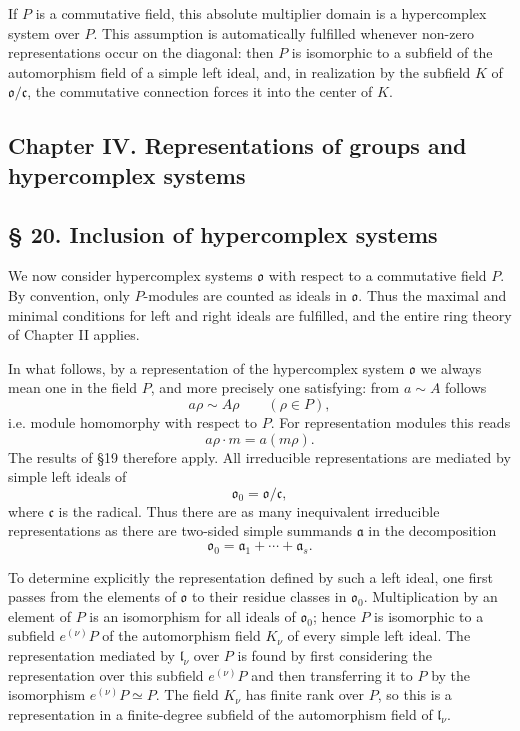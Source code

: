 \documentclass[11pt]{article}
\providecommand{\mo}{\mathfrak{o}}
\providecommand{\ma}{\mathfrak{a}}
\providecommand{\mc}{\mathfrak{c}}
\providecommand{\ml}{\mathfrak{l}}
\begin{document}
If $P$ is a commutative field, this absolute multiplier domain is a hypercomplex system over $P$. This assumption is automatically fulfilled whenever non-zero representations occur on the diagonal: then $P$ is isomorphic to a subfield of the automorphism field of a simple left ideal, and, in realization by the subfield $K$ of $\mo/\mc$, the commutative connection forces it into the center of $K$.

\subsection*{Chapter IV. Representations of groups and hypercomplex systems}

\subsection*{§ 20. Inclusion of hypercomplex systems}
We now consider hypercomplex systems $\mo$ with respect to a commutative field $P$. By convention, only $P$-modules are counted as ideals in $\mo$. Thus the maximal and minimal conditions for left and right ideals are fulfilled, and the entire ring theory of Chapter II applies.

In what follows, by a representation of the hypercomplex system $\mo$ we always mean one in the field $P$, and more precisely one satisfying: from $a\sim A$ follows
\[
        a\rho\sim A\rho\qquad(\rho\in P),
\]
i.e. module homomorphy with respect to $P$. For representation modules this reads
\[
        a\rho\cdot m=a(m\rho).
\]
The results of §19 therefore apply. All irreducible representations are mediated by simple left ideals of
\[
        \mo_0=\mo/\mc,
\]
where $\mc$ is the radical. Thus there are as many inequivalent irreducible representations as there are two-sided simple summands $\ma$ in the decomposition
\[
        \mo_0=\ma_1+\cdots+\ma_s.
\]

To determine explicitly the representation defined by such a left ideal, one first passes from the elements of $\mo$ to their residue classes in $\mo_0$. Multiplication by an element of $P$ is an isomorphism for all ideals of $\mo_0$; hence $P$ is isomorphic to a subfield $e^{(\nu)}P$ of the automorphism field $K_\nu$ of every simple left ideal. The representation mediated by $\ml_\nu$ over $P$ is found by first considering the representation over this subfield $e^{(\nu)}P$ and then transferring it to $P$ by the isomorphism $e^{(\nu)}P\simeq P$. The field $K_\nu$ has finite rank over $P$, so this is a representation in a finite-degree subfield of the automorphism field of $\ml_\nu$.
\end{document}
